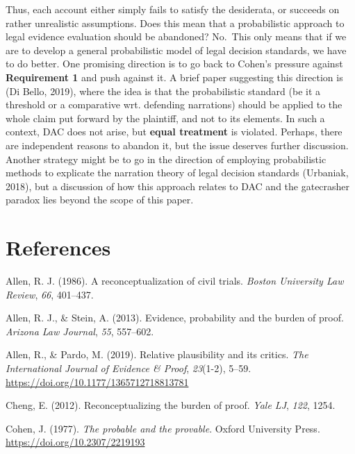 \documentclass[10pt,dvipsnames,enabledeprecatedfontcommands]{scrartcl}
\begin{document}
Thus, each account either simply fails to satisfy the desiderata, or
succeeds on rather unrealistic assumptions. Does this mean that a
probabilistic approach to legal evidence evaluation should be abandoned?
No.~This only means that if we are to develop a general probabilistic
model of legal decision standards, we have to do better. One promising
direction is to go back to Cohen's pressure against
\textbf{Requirement 1} and push against it. A brief paper suggesting
this direction is (Di Bello, 2019), where the idea is that the
probabilistic standard (be it a threshold or a comparative wrt.
defending narrations) should be applied to the whole claim put forward
by the plaintiff, and not to its elements. In such a context, DAC does
not arise, but \textbf{equal treatment} is violated. Perhaps, there are
independent reasons to abandon it, but the issue deserves further
discussion. Another strategy might be to go in the direction of
employing probabilistic methods to explicate the narration theory of
legal decision standards (Urbaniak, 2018), but a discussion of how this
approach relates to DAC and the gatecrasher paradox lies beyond the
scope of this paper.

\hypertarget{references}{%
\section*{References}\label{references}}

\hypertarget{refs}{}
\leavevmode\hypertarget{ref-Allen1986A-Reconceptuali}{}%
Allen, R. J. (1986). A reconceptualization of civil trials. \emph{Boston
University Law Review}, \emph{66}, 401--437.

\leavevmode\hypertarget{ref-allen2013}{}%
Allen, R. J., \& Stein, A. (2013). Evidence, probability and the burden
of proof. \emph{Arizona Law Journal}, \emph{55}, 557--602.

\leavevmode\hypertarget{ref-AllenPardo2019relative}{}%
Allen, R., \& Pardo, M. (2019). Relative plausibility and its critics.
\emph{The International Journal of Evidence \& Proof}, \emph{23}(1-2),
5--59. \url{https://doi.org/10.1177/1365712718813781}

\leavevmode\hypertarget{ref-cheng2012reconceptualizing}{}%
Cheng, E. (2012). Reconceptualizing the burden of proof. \emph{Yale LJ},
\emph{122}, 1254.

\leavevmode\hypertarget{ref-Cohen1977The-probable-an}{}%
Cohen, J. (1977). \emph{The probable and the provable}. Oxford
University Press. \url{https://doi.org/10.2307/2219193}
\end{document}

